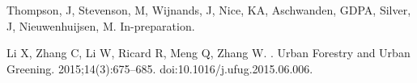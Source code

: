 Thompson, J, Stevenson, M, Wijnands, J, Nice, KA, Aschwanden, GDPA, Silver, J, Nieuwenhuijsen, M.
\newblock In-preparation.
  
Li X, Zhang C, Li W, Ricard R, Meng Q, Zhang W.
.
\newblock Urban Forestry and Urban Greening. 2015;14(3):675--685.
\newblock doi:{10.1016/j.ufug.2015.06.006}.











%
%
%
%
%
%
%
%
%
%
%
